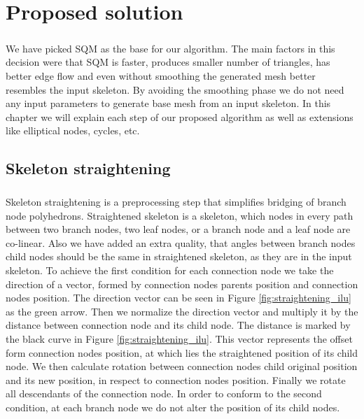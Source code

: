 \chapter{Proposed solution}
\paragraph{}
We have picked SQM as the base for our algorithm. The main factors in this decision were that SQM is faster, produces smaller number of triangles, has better edge flow and even without smoothing the generated mesh better resembles the input skeleton. By avoiding the smoothing phase we do not need any input parameters to generate base mesh from an input skeleton. In this chapter we will explain each step of our proposed algorithm as well as extensions like elliptical nodes, cycles, etc.

\section{Skeleton straightening}
\paragraph{}
Skeleton straightening is a preprocessing step that simplifies bridging of branch node polyhedrons. Straightened skeleton is a skeleton, which nodes in every path between two branch nodes, two leaf nodes, or a branch node and a leaf node are co-linear. Also we have added an extra quality, that angles between branch nodes child nodes should be the same in straightened skeleton, as they are in the input skeleton. To achieve the first condition for each connection node we take the direction of a vector, formed by connection nodes parents position and connection nodes position. The direction vector can be seen in Figure \ref{fig:straightening_ilu} as the green arrow. Then we normalize the direction vector and multiply it by the distance between connection node and its child node. The distance is marked by the black curve in Figure \ref{fig:straightening_ilu}. This vector represents the offset form connection nodes position, at which lies the straightened position of its child node. We then calculate rotation between connection nodes child original position and its new position, in respect to connection nodes position. Finally we rotate all descendants of the connection node. In order to conform to the second condition, at each branch node we do not alter the position of its child nodes.

